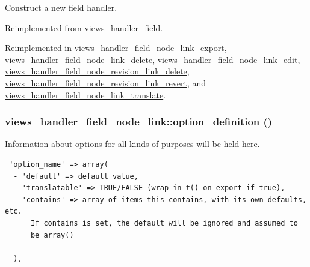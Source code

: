 Construct a new field handler. 

Reimplemented from \hyperlink{classviews__handler__field_3d50050864c255b71c842972a45d39f6}{views\_\-handler\_\-field}.

Reimplemented in \hyperlink{classviews__handler__field__node__link__export_1ccad9b1e274a9345a3f167a58e7f997}{views\_\-handler\_\-field\_\-node\_\-link\_\-export}, \hyperlink{classviews__handler__field__node__link__delete_e00ce6a645c0545eec54fac96a3a5cf9}{views\_\-handler\_\-field\_\-node\_\-link\_\-delete}, \hyperlink{classviews__handler__field__node__link__edit_8b0caf63f855b91c68b7dd000e2bef9e}{views\_\-handler\_\-field\_\-node\_\-link\_\-edit}, \hyperlink{classviews__handler__field__node__revision__link__delete_bec2f48d4827ff818da9c22716ccbd78}{views\_\-handler\_\-field\_\-node\_\-revision\_\-link\_\-delete}, \hyperlink{classviews__handler__field__node__revision__link__revert_51850ebf69c6cdbc043378a538931fc0}{views\_\-handler\_\-field\_\-node\_\-revision\_\-link\_\-revert}, and \hyperlink{classviews__handler__field__node__link__translate_99c65887da95497fc89023f57d07bc34}{views\_\-handler\_\-field\_\-node\_\-link\_\-translate}.\hypertarget{classviews__handler__field__node__link_68b2956fb07cb821f9f9ece53ddf7a20}{
\subsubsection[{option\_\-definition}]{\setlength{\rightskip}{0pt plus 5cm}views\_\-handler\_\-field\_\-node\_\-link::option\_\-definition ()}}
\label{classviews__handler__field__node__link_68b2956fb07cb821f9f9ece53ddf7a20}


Information about options for all kinds of purposes will be held here. 

\begin{Code}\begin{verbatim} 'option_name' => array(
  - 'default' => default value,
  - 'translatable' => TRUE/FALSE (wrap in t() on export if true),
  - 'contains' => array of items this contains, with its own defaults, etc.
      If contains is set, the default will be ignored and assumed to
      be array()

  ),
\end{verbatim}
\end{Code}

